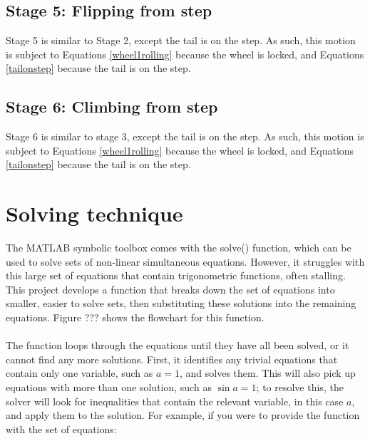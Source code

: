 \subsection*{Stage 5: Flipping from step}
Stage 5 is similar to Stage 2, except the tail is on the step. As such, this motion is subject to Equations \ref{wheel1rolling} because the wheel is locked, and Equations \ref{tailonstep} because the tail is on the step.\\

\subsection*{Stage 6: Climbing from step}
Stage 6 is similar to stage 3, except the tail is on the step. As such, this motion is subject to Equations \ref{wheel1rolling} because the wheel is locked, and Equations \ref{tailonstep} because the tail is on the step.\\

\section{Solving technique}
The MATLAB symbolic toolbox comes with the solve() function, which can be used to solve sets of non-linear simultaneous equations. However, it struggles with this large set of equations that contain trigonometric functions, often stalling. This project develops a function that breaks down the set of equations into smaller, easier to solve sets, then substituting these solutions into the remaining equations. Figure ??? shows the flowchart for this function. \\
\\
The function loops through the equations until they have all been solved, or it cannot find any more solutions. First, it identifies any trivial equations that contain only one variable, such as $a = 1$, and solves them. This will also pick up equations with more than one solution, such as $\sin{a} = 1$; to resolve this, the solver will look for inequalities that contain the relevant variable, in this case $a$, and apply them to the solution. For example, if you were to provide the function with the set of equations:\\

